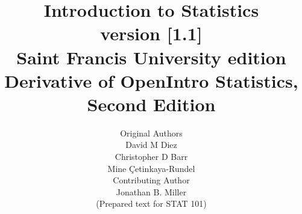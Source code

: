 

\title{\huge Introduction to Statistics \\[2mm]
\large version [1.1] \\
Saint Francis University edition \\
\normalsize Derivative of OpenIntro Statistics, Second Edition}


\author{\Large Original Authors \\[1.5mm]
\normalsize David M Diez \\
\normalsize Christopher D Barr \\
\normalsize Mine \c{C}etinkaya-Rundel \\[8mm]
\Large Contributing Author \\[1.5mm]
\normalsize Jonathan B. Miller \\
\small (Prepared text for STAT 101) \\[2mm]
}
